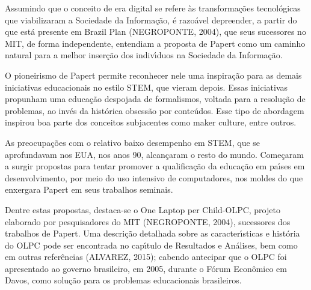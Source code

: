 \documentclass[
12pt,		%
openright,	%
twoside,  %
a4paper,			%
chapter=TITLE,		%
english,			%
french,				%
spanish,			%
brazil				%
]{USPSC-classe/USPSC}
\begin{document}
Assumindo que o conceito de \textquotedbl era digital \textquotedbl  se refere \`as transforma\c{c}\~oes tecnol\'ogicas que viabilizaram a \textquotedbl Sociedade da Informa\c{c}\~ao\textquotedbl ,  \'e razo\'avel depreender, a partir do que est\'a presente em Brazil Plan  (NEGROPONTE, 2004), que seus sucessores no MIT, de forma independente, entendiam a proposta de Papert como um caminho natural para a melhor inser\c{c}\~ao dos indiv\'{\i}duos na Sociedade da Informa\c{c}\~ao.

















O pioneirismo de Papert permite reconhecer nele uma inspira\c{c}\~ao para as demais iniciativas educacionais no estilo STEM, que vieram depois. Essas iniciativas propunham uma educa\c{c}\~ao despojada de formalismos, voltada para a resolu\c{c}\~ao de problemas, ao inv\'es da hist\'orica obsess\~ao por conte\'udos. Esse tipo de abordagem inspirou boa parte dos conceitos subjacentes como \textquotedbl maker culture\textquotedbl , entre outros.

















As preocupa\c{c}\~oes com o relativo baixo desempenho em STEM, que se aprofundavam nos EUA, nos anos 90, alcan\c{c}aram o resto do mundo. Come\c{c}aram a surgir propostas para tentar promover a qualifica\c{c}\~ao da educa\c{c}\~ao em pa\'{\i}ses em desenvolvimento, por meio do uso intensivo de computadores, nos moldes do que enxergara Papert em seus trabalhos seminais.

















Dentre estas propostas, destaca-se o \textquotedbl One Laptop per Child-OLPC\textquotedbl , projeto elaborado por pesquisadores do MIT  (NEGROPONTE, 2004), sucessores dos trabalhos de Papert. Uma descri\c{c}\~ao detalhada sobre as caracter\'{\i}sticas e hist\'oria do OLPC pode ser encontrada no cap\'{\i}tulo de Resultados e An\'alises, bem como em outras refer\^encias  (ALVAREZ, 2015); cabendo antecipar que o OLPC foi apresentado ao governo brasileiro, em 2005, durante o F\'orum Econ\^omico em Davos, como solu\c{c}\~ao para os problemas educacionais brasileiros.
\end{document}
